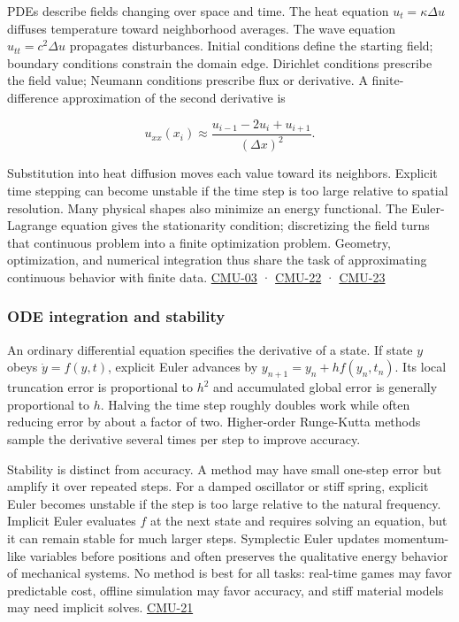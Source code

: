PDEs describe fields changing over space and time. The heat equation \(u_t=\kappa\Delta u\) diffuses temperature toward neighborhood averages. The wave equation \(u_{tt}=c^2\Delta u\) propagates disturbances. Initial conditions define the starting field; boundary conditions constrain the domain edge. Dirichlet conditions prescribe the field value; Neumann conditions prescribe flux or derivative. A finite-difference approximation of the second derivative is

\[
u_{xx}(x_i)\approx\frac{u_{i-1}-2u_i+u_{i+1}}{(\Delta x)^2}.
\]

Substitution into heat diffusion moves each value toward its neighbors. Explicit time stepping can become unstable if the time step is too large relative to spatial resolution. Many physical shapes also minimize an energy functional. The Euler-Lagrange equation gives the stationarity condition; discretizing the field turns that continuous problem into a finite optimization problem. Geometry, optimization, and numerical integration thus share the task of approximating continuous behavior with finite data. \hyperref[04-visual-computing-ii-ch036]{CMU-03} · \hyperref[04-visual-computing-ii-ch036]{CMU-22} · \hyperref[04-visual-computing-ii-ch036]{CMU-23}

\subsubsection{ODE integration and stability}\label{ode-integration-and-stability}

An ordinary differential equation specifies the derivative of a state. If state \(y\) obeys \(\dot y=f(y,t)\), explicit Euler advances by \(y_{n+1}=y_n+h f(y_n,t_n)\). Its local truncation error is proportional to \(h^2\) and accumulated global error is generally proportional to \(h\). Halving the time step roughly doubles work while often reducing error by about a factor of two. Higher-order Runge-Kutta methods sample the derivative several times per step to improve accuracy.

Stability is distinct from accuracy. A method may have small one-step error but amplify it over repeated steps. For a damped oscillator or stiff spring, explicit Euler becomes unstable if the step is too large relative to the natural frequency. Implicit Euler evaluates \(f\) at the next state and requires solving an equation, but it can remain stable for much larger steps. Symplectic Euler updates momentum-like variables before positions and often preserves the qualitative energy behavior of mechanical systems. No method is best for all tasks: real-time games may favor predictable cost, offline simulation may favor accuracy, and stiff material models may need implicit solves. \hyperref[04-visual-computing-ii-ch036]{CMU-21}

